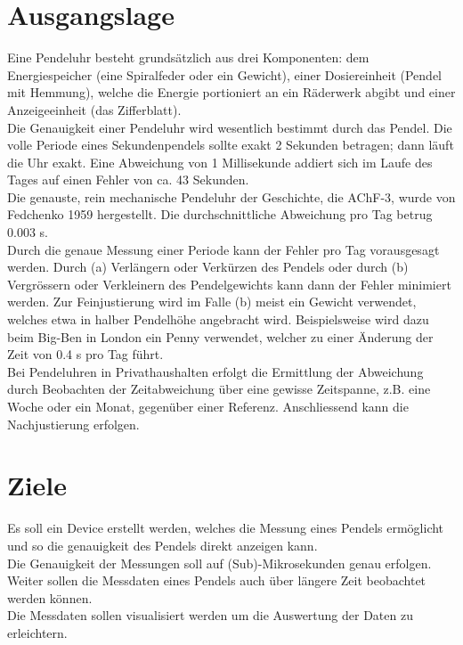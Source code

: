 \section{Ausgangslage}
Eine Pendeluhr besteht grundsätzlich aus drei Komponenten: dem Energiespeicher (eine Spiralfeder
oder ein Gewicht), einer Dosiereinheit (Pendel mit Hemmung), welche die Energie portioniert an ein
Räderwerk abgibt und einer Anzeigeeinheit (das Zifferblatt).\\
Die Genauigkeit einer Pendeluhr wird wesentlich bestimmt durch das Pendel. Die volle Periode eines Sekundenpendels sollte exakt 2 Sekunden betragen; dann läuft die Uhr exakt. Eine Abweichung von 1 Millisekunde addiert sich im Laufe des Tages auf einen Fehler von ca. 43 Sekunden.\\
Die genauste, rein mechanische Pendeluhr der Geschichte, die AChF-3, wurde von Fedchenko 1959
hergestellt. Die durchschnittliche Abweichung pro Tag betrug 0.003 s.\\
Durch die genaue Messung einer Periode kann der Fehler pro Tag vorausgesagt werden. Durch (a)
Verlängern oder Verkürzen des Pendels oder durch (b) Vergrössern oder Verkleinern des
Pendelgewichts kann dann der Fehler minimiert werden. Zur Feinjustierung wird im Falle (b) meist ein
Gewicht verwendet, welches etwa in halber Pendelhöhe angebracht wird. Beispielsweise wird dazu
beim Big-Ben in London ein \glqq{}Penny\grqq{} verwendet, welcher zu einer Änderung der Zeit von 0.4 s pro Tag führt.\\
Bei Pendeluhren in Privathaushalten erfolgt die Ermittlung der Abweichung durch Beobachten der Zeitabweichung über eine gewisse Zeitspanne, z.B. eine Woche oder ein Monat, gegenüber einer Referenz. Anschliessend kann die Nachjustierung erfolgen. 

\section{Ziele}
Es soll ein Device erstellt werden, welches die Messung eines Pendels ermöglicht und so die genauigkeit des Pendels direkt anzeigen kann.\\
Die Genauigkeit der Messungen soll auf (Sub)-Mikrosekunden genau erfolgen.\\
Weiter sollen die Messdaten eines Pendels auch über längere Zeit beobachtet werden können.\\
Die Messdaten sollen visualisiert werden um die Auswertung der Daten zu erleichtern.

